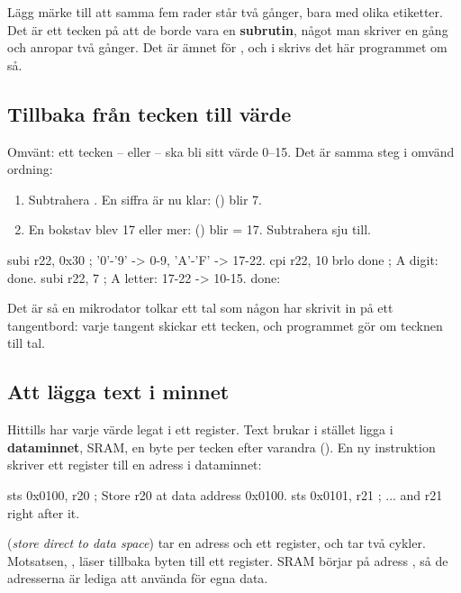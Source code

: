 Lägg märke till att samma fem rader står två gånger, bara med olika etiketter. Det är ett tecken på
att de borde vara en \textbf{subrutin}, något man skriver en gång och anropar två gånger. Det är
ämnet för , och i  skrivs det här programmet om så.

\subsection{Tillbaka från tecken till värde}
\label{c10:a4}
Omvänt: ett tecken -- eller -- ska bli sitt värde 0--15.
Det är samma steg i omvänd ordning:
\begin{enumerate}
  \item Subtrahera . En siffra är nu klar:  () blir 7.
  \item En bokstav blev 17 eller mer:  () blir  = 17. Subtrahera
    sju till.
\end{enumerate}

\begin{asmcode}
    subi r22, 0x30                  ; '0'-'9' -> 0-9, 'A'-'F' -> 17-22.
    cpi r22, 10
    brlo done                       ; A digit: done.
    subi r22, 7                     ; A letter: 17-22 -> 10-15.
done:
\end{asmcode}

\noindent Det är så en mikrodator tolkar ett tal som någon har skrivit in på ett tangentbord: varje
tangent skickar ett tecken, och programmet gör om tecknen till tal.

\subsection{Att lägga text i minnet}
\label{c10:a5}
Hittills har varje värde legat i ett register. Text brukar i stället ligga i
\textbf{dataminnet}, SRAM, en byte per tecken efter varandra (). En ny
instruktion skriver ett register till en adress i dataminnet:

\begin{asmcode}
    sts 0x0100, r20                 ; Store r20 at data address 0x0100.
    sts 0x0101, r21                 ; ... and r21 right after it.
\end{asmcode}

\noindent\textbf{} (\emph{store direct to data space}) tar en adress och ett register,
och tar två cykler. Motsatsen, \textbf{}, läser tillbaka byten till ett
register. SRAM börjar på adress , så de adresserna är lediga att använda för egna
data.

